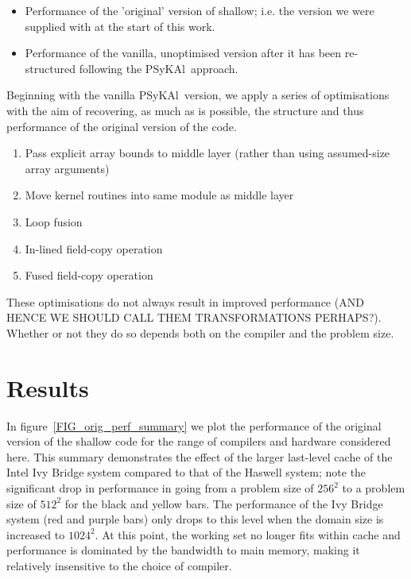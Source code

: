 \documentclass[journal]{IEEEtran}
\newcommand{\psykal}{{PS}y{KA}l\ }
\begin{document}
\begin{itemize}

\item Performance of the 'original' version of shallow; i.e. the version we
were supplied with at the start of this work.  

\item Performance of the vanilla, unoptimised version after it has been
re-structured following the \psykal approach.

\end{itemize}

Beginning with the vanilla \psykal version, we apply a series of
optimisations with the aim of recovering, as much as is possible, the
structure and thus performance of the original version of the code.

\begin{enumerate}

\item Pass explicit array bounds to middle layer (rather than using
  assumed-size array arguments)

\item Move kernel routines into same module as middle layer

\item Loop fusion

\item In-lined field-copy operation

\item Fused field-copy operation

\end{enumerate}

These optimisations do not always result in improved performance (AND
HENCE WE SHOULD CALL THEM TRANSFORMATIONS PERHAPS?). Whether or not
they do so depends both on the compiler and the problem size.

\section{Results}

In figure~\ref{FIG_orig_perf_summary} we plot the performance of the
original version of the shallow code for the range of compilers and
hardware considered here. This summary demonstrates the effect of the
larger last-level cache of the Intel Ivy Bridge system compared to
that of the Haswell system; note the significant drop in performance
in going from a problem size of $256^{2}$ to a problem size of
$512^{2}$ for the black and yellow bars. The performance of the Ivy
Bridge system (red and purple bars) only drops to this level when the
domain size is increased to $1024^{2}$. At this point, the working set
no longer fits within cache and performance is dominated by the
bandwidth to main memory, making it relatively insensitive to the
choice of compiler.  
\end{document}
